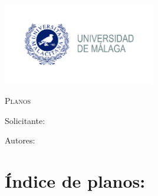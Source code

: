 \documentclass[../main.tex]{subfiles}
\begin{document}
\newpage
\thispagestyle{empty}
\begin{center}
    {\includegraphics[width=0.5\textwidth]{Imagenes/Logo UMA.jpg}\par}
    \vspace{1cm}
    {\bfseries\LARGE \Facultad \par}
    \vspace{0.5cm}
    {\scshape\Large \Grado \par}
    \vspace{3cm}
    {\scshape\Huge Planos \par}
    \vspace{1.5cm}
    {\itshape\Large \TituloProyecto \par}
    \vfill
    {\Large Solicitante: \par}
    {\Large \Solicitante  \par}
    \vspace{1cm}
    {\Large Autores: \par}
    {\Large \Autora \par}
    {\Large \Autor \par}
    \vfill
    {\Large \Fecha \par}
\end{center}

\chapter*{Índice de planos:}


    

    
\end{document}
